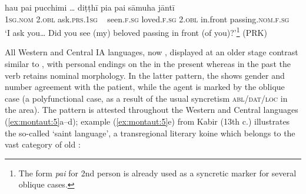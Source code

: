 \documentclass[output=paper]{langsci/langscibook}
\begin{document}
\ea
\label{ex:montaut:4}
\ea 
\gll hau  pai  pucchimi …   diṭṭhī       pia   pai    sāmuha   jāntī\\ 
\textsc{1sg.nom} \textsc{2.obl}    ask.\textsc{prs.1sg} ~   seen.\textsc{f.sg}  loved.\textsc{f.sg}  \textsc{2.obl}  in.front   passing.\textsc{nom.f.sg} \\
\glt ‘I ask you… Did you see (my) beloved passing in front (of you)?’\footnote{The form \textit{pai} for 2nd person is already used as a syncretic marker for several oblique cases.}     (PRK)
\z 
\z 

All Western and Central IA languages, now , displayed at an older stage contrast similar to , with personal endings on the  in the present whereas in the past the verb retains nominal morphology. In the latter pattern, the  shows gender and number agreement with the patient, while the agent is marked by the oblique case (a polyfunctional case, as a result of the usual syncretism \textsc{abl/dat/loc} in the area). The pattern is attested throughout the Western and Central languages (\ref{ex:montaut:5}a--d); example (\ref{ex:montaut:5}e) from Kabir (13th c.) illustrates the so-called ‘saint language’, a transregional literary koine which belongs to the vast category of old  \citep{Kellogg1875}:\newpage
\end{document}
